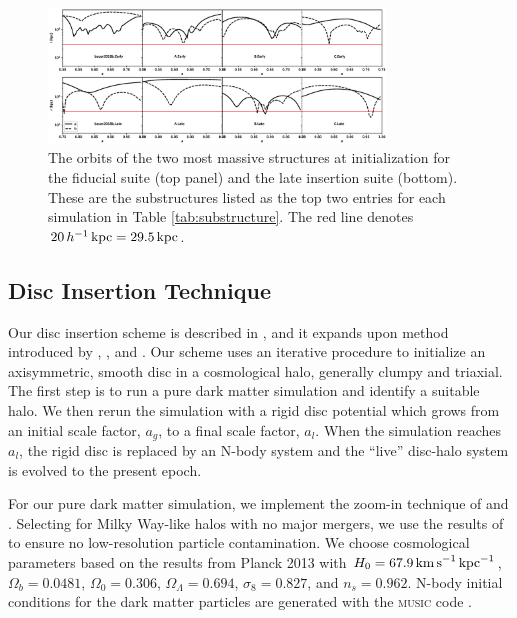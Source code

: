 \begin{figure}
	\centering
	\includegraphics[width=0.8\textwidth]{../figures/substructure_r_vs_t.eps}
	\caption{The orbits of the two most massive structures at initialization for the fiducial suite (top panel) and the late insertion suite (bottom). These are the substructures listed as the top two entries for each simulation in Table \ref{tab:substructure}. The red line denotes $20\, h^{-1} \, \text{kpc} = 29.5 \, \text{kpc}$. } \label{fig:substructure_orbits}
\end{figure}

\subsection{Disc Insertion Technique} \label{ssec:disc_insertio}

Our disc insertion scheme is described in \citet{bauer2018a}, and
it expands upon method introduced by
\citet{BerentzenShlosmanStellarDisks}, \citet{debuhr_2012}, and
\citet{ys_2015}. Our scheme uses an iterative procedure to
initialize an axisymmetric, smooth disc in a cosmological halo, generally clumpy and triaxial. 
The first step is to run a pure dark matter
simulation and identify a suitable halo.  We then rerun the simulation with a rigid disc potential which 
grows from an initial scale factor, $a_g$, to a final scale factor, $a_l$.
When the simulation reaches $a_l$,
the rigid disc is replaced by an N-body system and the ``live'' disc-halo
system is evolved to the present epoch. 

For our pure dark matter simulation, we implement the zoom-in
technique of \citet{KatzQuasarZoom} and \citet{NavarroWhiteZoom}.
Selecting for Milky Way-like halos with no major mergers, we use the
results of \cite{onorbe_etal_2014} to ensure no low-resolution particle contamination.
We choose cosmological parameters based on the results
from Planck 2013 \citep{planck_2014} with $H_0=67.9\,{\rm
  km\,s}^{-1}\,{\rm kpc}^{-1}$, $\Omega_b = 0.0481$, $\Omega_0 =
0.306$, $\Omega_\Lambda = 0.694$, $\sigma_8 = 0.827$, and $n_s =
0.962$.  N-body initial conditions for the dark matter particles are
generated with the \textsc{music} code \citep{music}.  

